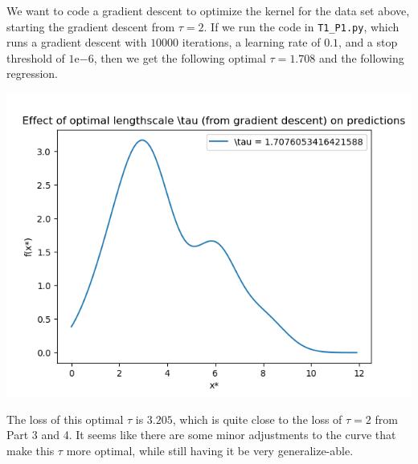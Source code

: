 \documentclass[submit]{harvardml}
\begin{document}
We want to code a gradient descent to optimize the kernel for the data set above, starting the gradient descent from $\tau = 2$. If we run the code in \verb+T1_P1.py+, which runs a gradient descent with $10000$ iterations, a learning rate of $0.1$, and a stop threshold of $1\mathrm{e}{-6}$, then we get the following optimal $\tau = 1.708$ and the following regression.
\begin{center}
    \includegraphics[scale=0.75]{lengthscale-optimal.png}
\end{center}
The loss of this optimal $\tau$ is $3.205$, which is quite close to the loss of $\tau = 2$ from Part 3 and 4. It seems like there are some minor adjustments to the curve that make this $\tau$ more optimal, while still having it be very generalize-able.

\newpage

\end{document}
